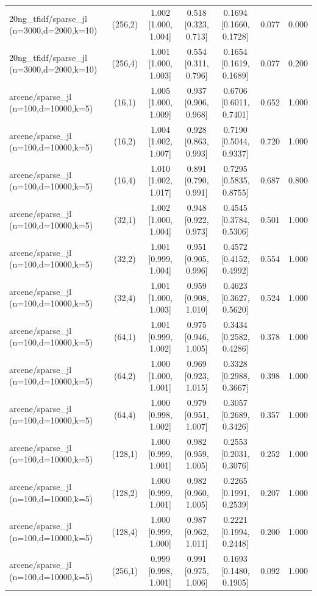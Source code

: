 \begin{tabular}{lcccccc}
20ng\_tfidf/sparse\_jl (n=3000,d=2000,k=10) & (256,2) & 1.002 [1.000, 1.004] & 0.518 [0.323, 0.713] & 0.1694 [0.1660, 0.1728] & 0.077 & 0.000 \\
20ng\_tfidf/sparse\_jl (n=3000,d=2000,k=10) & (256,4) & 1.001 [1.000, 1.003] & 0.554 [0.311, 0.796] & 0.1654 [0.1619, 0.1689] & 0.077 & 0.200 \\
arcene/sparse\_jl (n=100,d=10000,k=5) & (16,1) & 1.005 [1.000, 1.009] & 0.937 [0.906, 0.968] & 0.6706 [0.6011, 0.7401] & 0.652 & 1.000 \\
arcene/sparse\_jl (n=100,d=10000,k=5) & (16,2) & 1.004 [1.002, 1.007] & 0.928 [0.863, 0.993] & 0.7190 [0.5044, 0.9337] & 0.720 & 1.000 \\
arcene/sparse\_jl (n=100,d=10000,k=5) & (16,4) & 1.010 [1.002, 1.017] & 0.891 [0.790, 0.991] & 0.7295 [0.5835, 0.8755] & 0.687 & 0.800 \\
arcene/sparse\_jl (n=100,d=10000,k=5) & (32,1) & 1.002 [1.000, 1.004] & 0.948 [0.922, 0.973] & 0.4545 [0.3784, 0.5306] & 0.501 & 1.000 \\
arcene/sparse\_jl (n=100,d=10000,k=5) & (32,2) & 1.001 [0.999, 1.004] & 0.951 [0.905, 0.996] & 0.4572 [0.4152, 0.4992] & 0.554 & 1.000 \\
arcene/sparse\_jl (n=100,d=10000,k=5) & (32,4) & 1.001 [1.000, 1.003] & 0.959 [0.908, 1.010] & 0.4623 [0.3627, 0.5620] & 0.524 & 1.000 \\
arcene/sparse\_jl (n=100,d=10000,k=5) & (64,1) & 1.001 [0.999, 1.002] & 0.975 [0.946, 1.005] & 0.3434 [0.2582, 0.4286] & 0.378 & 1.000 \\
arcene/sparse\_jl (n=100,d=10000,k=5) & (64,2) & 1.000 [1.000, 1.001] & 0.969 [0.923, 1.015] & 0.3328 [0.2988, 0.3667] & 0.398 & 1.000 \\
arcene/sparse\_jl (n=100,d=10000,k=5) & (64,4) & 1.000 [0.998, 1.002] & 0.979 [0.951, 1.007] & 0.3057 [0.2689, 0.3426] & 0.357 & 1.000 \\
arcene/sparse\_jl (n=100,d=10000,k=5) & (128,1) & 1.000 [0.999, 1.001] & 0.982 [0.959, 1.005] & 0.2553 [0.2031, 0.3076] & 0.252 & 1.000 \\
arcene/sparse\_jl (n=100,d=10000,k=5) & (128,2) & 1.000 [0.999, 1.001] & 0.982 [0.960, 1.005] & 0.2265 [0.1991, 0.2539] & 0.207 & 1.000 \\
arcene/sparse\_jl (n=100,d=10000,k=5) & (128,4) & 1.000 [0.999, 1.000] & 0.987 [0.962, 1.011] & 0.2221 [0.1994, 0.2448] & 0.200 & 1.000 \\
arcene/sparse\_jl (n=100,d=10000,k=5) & (256,1) & 0.999 [0.998, 1.001] & 0.991 [0.975, 1.006] & 0.1693 [0.1480, 0.1905] & 0.092 & 1.000 \\

\end{tabular}
